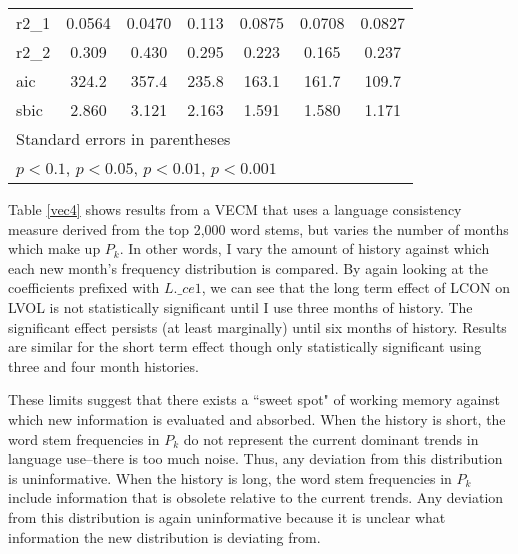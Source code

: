 \begin{table}
\begin{center}
{\begin{tabular}{l*{6}{c}}
r2\_1      &   0.0564         &   0.0470         &    0.113         &   0.0875         &   0.0708         &   0.0827         \\
r2\_2      &    0.309         &    0.430         &    0.295         &    0.223         &    0.165         &    0.237         \\
aic       &    324.2         &    357.4         &    235.8         &    163.1         &    161.7         &    109.7         \\
sbic      &    2.860         &    3.121         &    2.163         &    1.591         &    1.580         &    1.171         \\
\hline\hline
\multicolumn{7}{l}{\footnotesize Standard errors in parentheses}\\
\multicolumn{7}{l}{\footnotesize \sym{+} \(p<0.1\), \sym{*} \(p<0.05\), \sym{**} \(p<0.01\), \sym{***} \(p<0.001\)}\\
\end{tabular}
}

\end{center}
\end{table}

Table \ref{vec4} shows results from a VECM that uses a language consistency measure derived from the top 2,000 word stems, but varies the number of months which make up $P_k$. In other words, I vary the amount of history against which each new month's frequency distribution is compared. By again looking at the coefficients prefixed with $L.\_ce1$, we can see that the long term effect of LCON on LVOL is not statistically significant until I use three months of history. The significant effect persists (at least marginally) until six months of history. Results are similar for the short term effect though only statistically significant using three and four month histories.

These limits suggest that there exists a ``sweet spot" of working memory against which new information is evaluated and absorbed. When the history is short, the word stem frequencies in $P_k$ do not represent the current dominant trends in language use--there is too much noise. Thus, any deviation from this distribution is uninformative. When the history is long, the word stem frequencies in $P_k$ include information that is obsolete relative to the current trends. Any deviation from this distribution is again uninformative because it is unclear what information the new distribution is deviating from.

